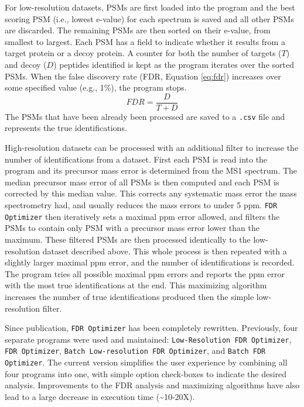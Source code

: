 For low-resolution datasets, PSMs are first loaded into the program and the best scoring PSM (i.e., lowest e-value) for each spectrum is saved and all other PSMs are discarded. The remaining PSMs are then sorted on their e-value, from smallest to largest. Each PSM has a field to indicate whether it results from a target protein or a decoy protein. A counter for both the number of targets ($T$) and decoy ($D$) peptides identified is kept as the program iterates over the sorted PSMs. When the false discovery rate (FDR, Equation \ref{eq:fdr}) increases over some specified value (e.g., 1\%), the program stops.
\begin{equation}
FDR =\frac{D}{T + D}
\label{eq:fdr}
\end{equation}
The PSMs that have been already been processed are saved to a \texttt{.csv} file and represents the true identifications. 

High-resolution datasets can be processed with an additional filter to increase the number of identifications from a dataset. First each PSM is read into the program and its precursor mass error is determined from the MS1 spectrum. The median precursor mass error of all PSMs is then computed and each PSM is corrected by this median value. This corrects any systematic mass error the mass spectrometry had, and usually reduces the mass errors to under 5 ppm. \texttt{FDR Optimizer} then iteratively sets a maximal ppm error allowed, and filters the PSMs to contain only PSM with a precursor mass error lower than the maximum. These filtered PSMs are then processed identically to the low-resolution dataset described above. This whole process is then repeated with a slightly larger maximal ppm error, and the number of identifications is recorded. The program tries all possible maximal ppm errors and reports the ppm error with the most true identifications at the end. This maximizing algorithm increases the number of true identifications produced then the simple low-resolution filter.

Since publication, \texttt{FDR Optimizer} has been completely rewritten. Previously, four separate programs were used and maintained: \texttt{Low-Resolution FDR Optimizer}, \texttt{FDR Optimizer}, \texttt{Batch Low-resolution FDR Optimizer}, and \texttt{Batch FDR Optimizer}. The current version simplifies the user experience by combining all four programs into one, with simple option check-boxes to indicate the desired analysis. Improvements to the FDR analysis and maximizing algorithms have also lead to a large decrease in execution time (\textasciitilde10-20X).

